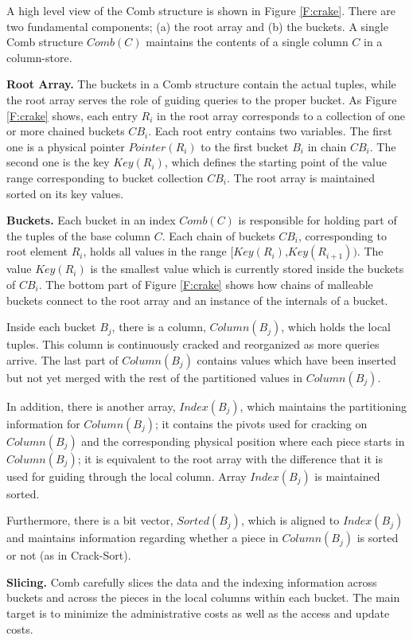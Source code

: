 A high level view of the Comb structure is shown in Figure \ref{F:crake}.
There are two fundamental components; (a) the root array and (b) the buckets.
A single Comb structure $Comb(C)$ maintains the contents of a single column $C$ in a column-store. 

\textbf{Root Array.}
The buckets in a Comb structure contain the actual tuples, while the root array serves the role
of guiding queries to the proper bucket.
As Figure \ref{F:crake} shows, each entry $R_i$ in the root array corresponds to a collection 
of one or more chained buckets $CB_i$.
Each root entry contains two variables. The first one is a physical pointer $Pointer(R_i)$
to the first bucket $B_i$ in chain $CB_i$.
The second one is the key $Key(R_i)$, which defines the starting point of the value range corresponding to bucket 
collection $CB_i$.
The root array is maintained sorted on its key values.

\textbf{Buckets.}
Each bucket in an index $Comb(C)$ is responsible for holding part of the tuples of the base column $C$.
Each chain of buckets $CB_i$, corresponding to root element $R_i$, holds all values in the range $[Key(R_i)$,$Key(R_{i+1}))$.
The value $Key(R_i)$ is the smallest value which is currently stored inside the buckets of $CB_i$.
The bottom part of Figure \ref{F:crake} shows how chains of malleable buckets 
connect to the root array and an instance of the internals of a bucket.

Inside each bucket $B_j$, there is a column, $Column(B_j)$, which holds the local tuples. 
This column is continuously cracked and reorganized as more queries arrive.
The last part of $Column(B_j)$ contains values which have been inserted but not yet merged with
the rest of the partitioned values in $Column(B_j)$.  

In addition, there is another array, $Index(B_j)$, which maintains the partitioning information for $Column(B_j)$;
it contains the pivots used for cracking on $Column(B_j)$ and the corresponding physical position
where each piece starts in $Column(B_j)$; it is equivalent to the root array with the difference that it is used 
for guiding through the local column. 
Array $Index(B_j)$ is maintained sorted.

Furthermore, there is a bit vector, $Sorted(B_j)$, which is aligned to $Index(B_j)$ and 
maintains information regarding whether a piece in $Column(B_j)$ is sorted or not (as in Crack-Sort). 

\textbf{Slicing.}
Comb carefully slices the data and the indexing information across buckets
and across the pieces in the local columns within each bucket.
The main target is to minimize the administrative costs as well as the access and update costs.

